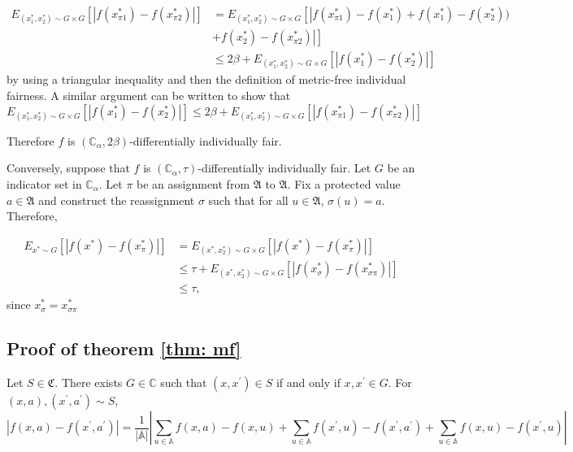 \documentclass{article}
\begin{document}
\begin{equation}
\begin{split}
    E_{(x^{*}_{1}, x^{*}_{2})\sim G \times G}\left[\left|f(x_{\pi1}^{*}) - f(x_{\pi2}^{*})\right|\right]  & = E_{(x^{*}_{1}, x^{*}_{2})\sim G \times G}\left[\left|f(x_{\pi1}^{*}) - f(x_{1}^{*}) + f(x_{1}^{*}) - f(x_{2}^{*}))\right.\right. \\
    & + \left.\left. f(x^{*}_{2}) - f(x_{\pi2}^{*})\right|\right] \\
    & \leq 2\beta + E_{(x^{*}_{1}, x^{*}_{2})\sim G \times G}\left[\left|f(x_{1}^{*}) - f(x_{2}^{*})\right|\right] 
    \end{split}
\end{equation}
by using a triangular inequality and then the definition of metric-free individual fairness. A similar argument can be written to show that  
\begin{equation}
    E_{(x^{*}_{1}, x^{*}_{2})\sim G \times G}\left[\left|f(x_{1}^{*}) - f(x_{2}^{*})\right|\right] \leq 2\beta +  E_{(x^{*}_{1}, x^{*}_{2})\sim G \times G}\left[\left|f(x_{\pi1}^{*}) - f(x_{\pi2}^{*})\right|\right]
\end{equation}

Therefore $f$ is $(\mathbb{C}_{\alpha}, 2\beta)$-differentially individually fair.

\bigskip
Conversely, suppose that $f$ is $(\mathbb{C}_{\alpha}, \tau)$-differentially individually fair. Let $G$ be an indicator set in $\mathbb{C}_{\alpha}$. Let $\pi$ be an assignment from $\mathfrak{A}$ to $\mathfrak{A}$. Fix a protected value $a\in \mathfrak{A}$ and construct  the reassignment $\sigma$ such that for all $u\in \mathfrak{A}$, $\sigma(u)=a$. Therefore,
 
\begin{equation}
\begin{split}
    E_{x^{*}\sim G}\left[\left|f(x^{*}) - f(x^{*}_{\pi})\right|\right]  & = E_{(x^{*}, x_{2}^{*})\sim G \times G}\left[\left|f(x^{*}) - f(x^{*}_{\pi})\right|\right] \\
    & \leq  \tau +  E_{(x^{*}, x_{2}^{*})\sim G \times G}\left[\left|f(x^{*}_{\sigma}) - f(x^{*}_{\sigma\pi})\right|\right]  \\
    & \leq \tau,
    \end{split}
\end{equation}
since $x^{*}_{\sigma} = x^{*}_{\sigma\pi}$

\subsection{Proof of theorem \ref{thm: mf}}
Let $S\in \mathfrak{C}$. There exists $G\in \mathbb{C}$ such that $(x,x^{'})\in S$ if and only if $x, x^{'}\in G$. For $(x,a), (x^{'}, a^{'})\sim S$, 
\begin{equation}
    \left|f(x,a) - f(x^{'}, a^{'})\right| = \frac{1}{|\mathbb{A}|}\left|\displaystyle\sum_{u\in \mathbb{A}} f(x,a) - f(x,u) + \displaystyle\sum_{u\in \mathbb{A}} f(x^{'},u) - f(x^{'},a^{'}) + \displaystyle\sum_{u\in \mathbb{A}} f(x,u) - f(x^{'},u)\right|
\end{equation}
\end{document}
